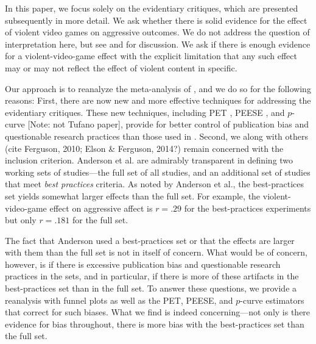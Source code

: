 \documentclass[man]{apa6}
\begin{document}
In this paper, we focus solely on the evidentiary critiques, which are presented subsequently in more detail.  We ask whether there is solid evidence for the effect of violent video games on aggressive outcomes.  We do not address the question of interpretation here, but see \citet{Elson:Ferguson:2013} and \citet{Bushman:Huesmann:2013} for discussion.   We ask if there is enough evidence for a violent-video-game effect with the explicit limitation that any such effect may or may not reflect the effect of violent content in specific.

Our approach is to reanalyze the meta-analysis of \citet{Anderson:etal:2010}, and we do so for the following reasons:  First, there are now new and more effective techniques for addressing the evidentiary critiques.  These new techniques, including PET \citep[Precision-effect test][]{Stanley:Doucouliagos:2013}, PEESE \citep[Precision-Effect Estimate with Standard Error][]{Stanley:Doucouliagos:2013}, and $p$-curve \citep{Simonsohn:etal:2014}[Note: not Tufano paper], provide for better control of publication bias and questionable research practices than those used in \citet{Anderson:etal:2010}.  Second, we along with others (cite Ferguson, 2010; Elson \& Ferguson, 2014?) remain concerned with the inclusion criterion.  Anderson et al. are admirably transparent in defining two working sets of studies---the full set of all studies, and an additional set of studies that meet {\em best practices} criteria.  As noted by Anderson et al., the best-practices set yields somewhat larger effects than the full set.  For example, the violent-video-game effect on aggressive affect is $r=.29$ for the best-practices experiments but only $r=.181$ for the full set.  

The fact that Anderson used a best-practices set or that the effects are larger with them than the full set is not in itself of concern.  What would be of concern, however, is if there is excessive publication bias and questionable research practices in the sets, and in particular, if there is more of these artifacts in the best-practices set than in the full set.  To answer these questions, we provide a reanalysis with funnel plots as well as the PET, PEESE, and $p$-curve estimators that correct for such biases.  What we find is indeed concerning---not only is there evidence for bias throughout, there is more bias with the best-practices set than the full set.  
\end{document}
